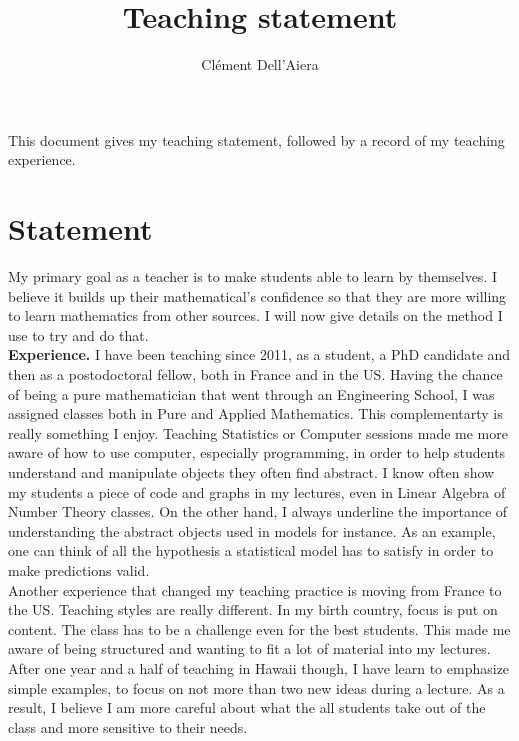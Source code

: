 \documentclass[a4paper]{article}
\title{Teaching statement}
\date{}
\author{ Clément Dell'Aiera}
\begin{document}
\maketitle

This document gives my teaching statement, followed by a record of my teaching experience. 
 
\section{Statement}

My primary goal as a teacher is to make students able to learn by themselves. I believe it builds up their mathematical’s confidence so that they are more willing to learn mathematics from other sources. I will now give details  on the method I use to try and do that.\\

\textbf{Experience.} I have been teaching since 2011, as a student, a PhD candidate and then as a postodoctoral fellow, both in France and in the US. Having the chance of being a pure mathematician that went through an Engineering School, I was assigned classes both in Pure and Applied Mathematics. This complementarty is really something I enjoy. Teaching Statistics or Computer sessions made me more aware of how to use computer, especially programming, in order to help students understand and manipulate objects they often find abstract. I know often show my students a piece of code and graphs in my lectures, even in Linear Algebra of Number Theory classes. On the other hand, I always underline the importance of understanding the abstract objects used in models for instance. As an example, one can think of all the hypothesis a statistical model has to satisfy in order to make predictions valid.\\

Another experience that changed my teaching practice is moving from France to the US. Teaching styles are really different. In my birth country, focus is put on content. The class has to be a challenge even for the best students. This made me aware of being structured and wanting to fit a lot of material into my lectures. After one year and a half of teaching in Hawaii though, I have learn to emphasize simple examples, to focus on not more than two new ideas during a lecture. As a result, I believe I am more careful about what the all students take out of the class and more sensitive to their needs.\\    
\end{document}
